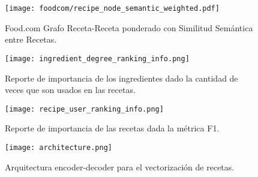 \documentclass[
	a4paper, %
	10pt, %
	unnumberedsections, %
	twoside, %
]{LTJournalArticle}
\begin{document}
\begin{figure} %
	\texttt{[image: foodcom/recipe\_node\_semantic\_weighted.pdf]}
	\caption{Food.com Grafo Receta-Receta ponderado con Similitud Semántica entre Recetas.}
	\label{fig:foodcom_recipe_semantic}
\end{figure}

\begin{figure*}
	\texttt{[image: ingredient\_degree\_ranking\_info.png]}
	\caption{Reporte de importancia de los ingredientes dado la cantidad de veces que son usados en las recetas.}
	\label{fig:ingredient_degree_ranking_info}
\end{figure*}

\begin{figure*}
	\texttt{[image: recipe\_user\_ranking\_info.png]}
	\caption{Reporte de importancia de las recetas dada la métrica F1.}
	\label{fig:recipe_user_ranking_info}
\end{figure*}

\begin{figure*}
	\texttt{[image: architecture.png]}
	\caption{Arquitectura encoder-decoder para el vectorización de recetas.}
	\label{fig:encoder_decoder}
\end{figure*}

\end{document}
